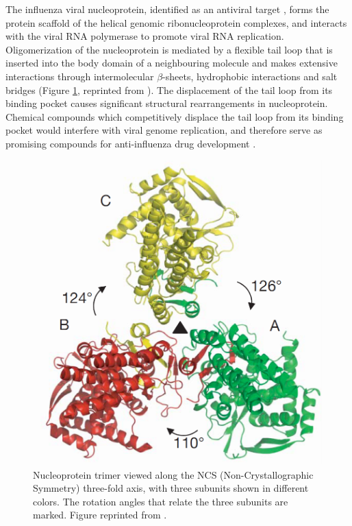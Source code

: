 The influenza viral nucleoprotein, identified as an antiviral target \citep{906}, forms the protein scaffold of the helical genomic ribonucleoprotein complexes, and interacts with the viral RNA polymerase to promote viral RNA replication. Oligomerization of the nucleoprotein is mediated by a flexible tail loop that is inserted into the body domain of a neighbouring molecule and makes extensive interactions through intermolecular $\beta$-sheets, hydrophobic interactions and salt bridges \citep{1140} (Figure \ref{Case:InfluenzaNucleoprotein}, reprinted from \citep{1140}). The displacement of the tail loop from its binding pocket causes significant structural rearrangements in nucleoprotein. Chemical compounds which competitively displace the tail loop from its binding pocket would interfere with viral genome replication, and therefore serve as promising compounds for anti-influenza drug development \citep{1140}.

\begin{figure}
\centering
\includegraphics[width=\linewidth]{Case/InfluenzaNucleoprotein.png}
\caption{Nucleoprotein trimer viewed along the NCS (Non-Crystallographic Symmetry) three-fold axis, with three subunits shown in different colors. The rotation angles that relate the three subunits are marked. Figure reprinted from \citep{1140}.}
\label{Case:InfluenzaNucleoprotein}
\end{figure}

